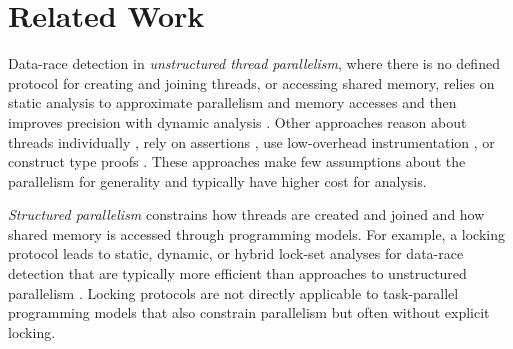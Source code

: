 \section{Related Work} \label{sec:rel-work}
Data-race detection in \emph{unstructured thread parallelism}, where there is no defined protocol for creating and joining threads, or accessing shared memory, relies on static analysis to approximate parallelism and memory accesses \cite{schonberg1989fly,choi2001static,kahlon2009static,kulikov2010detecting,vechev2011automatic} and then improves precision with dynamic analysis \cite{lamport1978time,Godefroid,flanagan2009fasttrack,EraserUpgrade,dimitrov2014commutativity}. Other approaches reason about threads individually \cite{xu1997rely,flanagan2003thread,henzinger2003thread,malkis2007precise,gotsman2007thread}, rely on  assertions \cite{burnim2009asserting, burnim2010determin, hong2012testing, yu2012maple, terragni2015recontest, yu2014simrt, leon2015unfolding, kahkonen2015unfolding}, use low-overhead instrumentation \cite{nistor2010instantcheck}, or construct type proofs \cite{abadi2006types}. These approaches  make few assumptions about the parallelism for generality and typically have higher cost for analysis. 

\emph{Structured parallelism} constrains how threads are created and joined and how shared memory is accessed through programming models. For example, a locking protocol leads to static, dynamic, or hybrid lock-set analyses for data-race detection that are typically more efficient than approaches to unstructured parallelism \cite{savage1997eraser,engler2003racerx,locksets-msr,elmas2006goldilocks,naik2006effective,elmas2007goldilocks,voung2007relay,kahlon2010universal}. Locking protocols are not directly applicable to task-parallel programming models that also constrain parallelism but often without explicit locking. 

